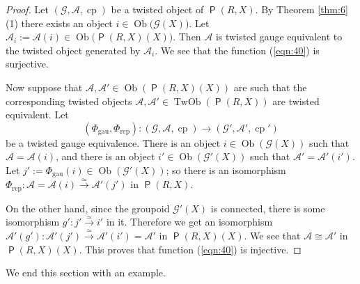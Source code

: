 \documentclass[a4paper, 10pt]{amsart}
\theoremstyle{definition}
\numberwithin{equation}{section}
\newcommand{\iso}{\xrightarrow{\simeq}}
\newcommand{\opn}{\operatorname}
\newcommand{\cat}[1]{\operatorname{\mathsf{#1}}}
\newcommand{\mcal}[1]{\mathcal{#1}}
\newcommand{\mrm}[1]{\mathrm{#1}}
\newcommand{\bsym}[1]{\boldsymbol{#1}}
\newcommand{\gerbe}[1]{\bsym{\mcal{#1}}}
\newcommand{\twocat}[1]{\operatorname{\bsym{\cat{#1}}}}
\begin{document}
\begin{proof}
Let $(\gerbe{G}, \gerbe{A}, \opn{cp})$ be a twisted object of 
$\twocat{P}(R, X)$. By Theorem \ref{thm:6}(1) there exists an object
$i \in \opn{Ob} \bigl( \gerbe{G}(X) \bigr)$.
Let 
$\mcal{A}_i := \gerbe{A}(i) \in \opn{Ob} \bigl( \twocat{P}(R, X)(X) \bigr).$
Then $\gerbe{A}$ is twisted gauge
equivalent to the twisted object generated by $\mcal{A}_i$.
We see that the function (\ref{eqn:40}) is surjective. 

Now suppose that 
$\mcal{A}, \mcal{A}' \in \opn{Ob} ( \twocat{P}(R, X)(X) )$
are such that the corresponding twisted objects
$\gerbe{A}, \gerbe{A}' \in \opn{TwOb}(\twocat{P}(R, X))$
are twisted equivalent. Let 
\[ (\Phi_{\mrm{gau}}, \Phi_{\mrm{rep}}) :
(\gerbe{G}, \gerbe{A}, \opn{cp}) \to 
(\gerbe{G}', \gerbe{A}', \opn{cp}') \]
be a twisted gauge equivalence. 
There is an object
$i \in \opn{Ob} ( \gerbe{G}(X) )$
such that $\mcal{A} = \gerbe{A}(i)$, and there is an object
$i' \in \opn{Ob} ( \gerbe{G}'(X) )$
such that $\mcal{A}' = \gerbe{A}'(i')$.
Let 
$j' := \Phi_{\mrm{gau}}(i) \in \opn{Ob} ( \gerbe{G}'(X) )$; 
so there is an isomorphism 
$\Phi_{\mrm{rep}} : \mcal{A} = \gerbe{A}(i) \iso \gerbe{A}'(j')$
in $\twocat{P}(R, X)$. 

On the other hand, since the groupoid
$\gerbe{G}'(X)$ is connected, there is some isomorphism 
$g' : j' \iso i'$ in it. Therefore we get an isomorphism
$\gerbe{A}'(g') : \gerbe{A}'(j') \iso \gerbe{A}'(i') = \mcal{A}'$
in $\twocat{P}(R, X)(X)$. We see that 
$\mcal{A} \cong \mcal{A}'$ in $\twocat{P}(R, X)(X)$. This proves that 
function (\ref{eqn:40}) is injective. 
\end{proof}

We end this section with an example.
\end{document}
